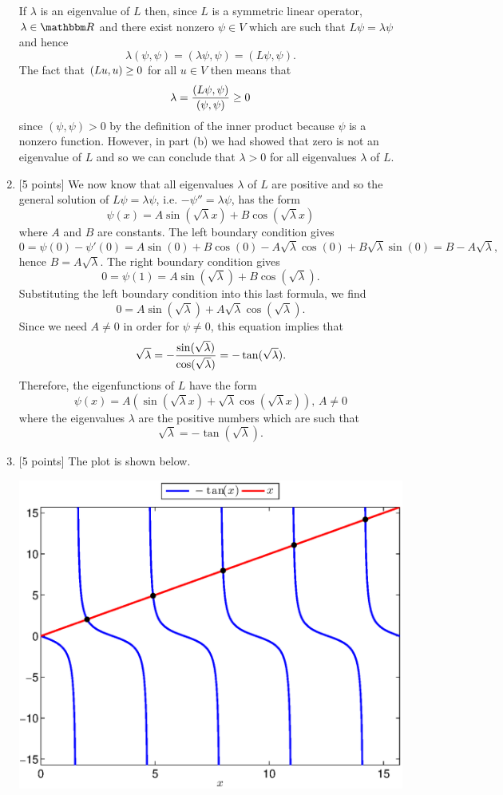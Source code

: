 \begin{solution}
\begin{enumerate}
If $\lambda$ is an eigenvalue of $L$ then, since $L$ is a symmetric linear operator, $\lambda\in\R$ and there exist nonzero $\psi\in V$ which are such that $L\psi=\lambda\psi$ and hence
\[
 \lambda(\psi,\psi) = ( \lambda\psi,\psi)= ( L\psi,\psi).
\]
The fact that $(Lu,u)\ge0$ for all $u\in V$ then means that
\[
 \lambda = {( L\psi,\psi) \over (\psi,\psi)}\ge0
\]
since $(\psi,\psi)>0$ by the definition of the inner product because $\psi$ is a nonzero function. However, in part (b) we had showed that zero is not an eigenvalue of $L$ and so we can conclude that $\lambda >0$ for all eigenvalues $\lambda$ of $L$.

\item {[5 points]} We now know that all eigenvalues $\lambda$ of $L$ are positive and so the general solution of $L\psi = \lambda \psi$, i.e. $-\psi'' = \lambda \psi$, has the form
      \[
\psi(x) = A \sin(\sqrt{\lambda} x) + B \cos(\sqrt{\lambda} x)
\]
 where $A$ and $B$ are constants. The left boundary condition gives
      \[
0 = \psi(0) - \psi'(0) = A \sin(0) + B \cos(0)- A \sqrt{\lambda} \cos(0)+ B \sqrt{\lambda} \sin(0)= B - A \sqrt{\lambda},
\]
      hence $B = A \sqrt{\lambda}$.
      The right boundary condition gives
      \[
0 = \psi(1) = A \sin(\sqrt{\lambda}) + B \cos(\sqrt{\lambda}).
\]
      Substituting the left boundary condition into this last formula, we find
       \[ 
0 = A \sin(\sqrt{\lambda}) + A \sqrt{\lambda} \cos(\sqrt{\lambda}).
\]
Since we need $A\ne 0$ in order for $\psi\ne0$, this equation implies that
       \[ 
\sqrt{\lambda} = - {\sin(\sqrt{\lambda}) \over \cos(\sqrt{\lambda})}
                         = -\tan(\sqrt{\lambda}).
\]
Therefore, the eigenfunctions of $L$ have the form
\[
\psi(x) = A(\sin(\sqrt{\lambda} x) + \sqrt{\lambda}\cos(\sqrt{\lambda} x)),\, A\ne0
\]
where the eigenvalues $\lambda$ are the positive numbers which are such that
\[
\sqrt{\lambda} = -\tan(\sqrt{\lambda}).
\]


\item {[5 points]} The plot is shown below.

\begin{center}
\includegraphics[scale=0.7]{eigroot}
\end{center}


\end{enumerate}
\end{solution}
